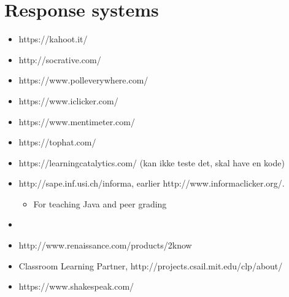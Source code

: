 \section{Response systems}
\begin{itemize}
    \item https://kahoot.it/
    \item http://socrative.com/
    \item https://www.polleverywhere.com/
    \item https://www.iclicker.com/
    \item https://www.mentimeter.com/
    \item https://tophat.com/
    \item https://learningcatalytics.com/ (kan ikke teste det, skal have en kode)
    \item http://sape.inf.usi.ch/informa, earlier http://www.informaclicker.org/.
        \begin{itemize}
            \item For teaching Java and peer grading
        \end{itemize}
    \item 
    \item http://www.renaissance.com/products/2know
    \item Classroom Learning Partner, http://projects.csail.mit.edu/clp/about/
    \item https://www.shakespeak.com/ 
\end{itemize}

